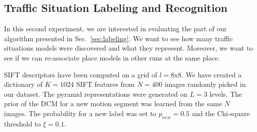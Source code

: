 \subsection{Traffic Situation Labeling and Recognition}
In this second experiment, we are interested in evaluating the part of our
algorithm presented in Sec.~\ref{sec:labeling}. We want to see how many traffic
situations models were discovered and what they represent. Moreover, we want
to see if we can re-associate place models in other runs at the same place.

SIFT descriptors have been computed on a grid of $l=8$x$8$. We have created a
dictionary of $K=1024$ SIFT features from $N=400$ images randomly picked in our
dataset. The pyramid representations were generated on $L=3$ levels. The prior
of the DCM for a new motion segment was learned from the same $N$ images. The
probability for a new label was set to $p_{new}=0.5$ and the Chi-square
threshold to $\xi=0.1$.
